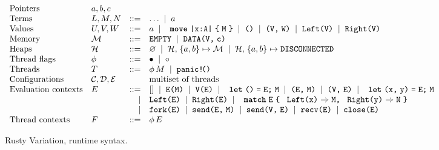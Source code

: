 \begin{figure*}
  \begin{mdframed}\begin{highlight}
    \centering
    \(
    \begin{array}{llrl}
      \text{Pointers}
      &\tm{a}, \tm{b}, \tm{c}
      \\
      \text{Terms}
      &\tm{L}, \tm{M}, \tm{N}
      &::= & \dots
             \sep \tm{a}
      \\
      \text{Values}
      &\tm{U}, \tm{V}, \tm{W}
      &::= & \tm{a}
             \sep \rvAbs[A]{x}{M}
             \sep \rvUnit
             \sep \rvPair{V}{W}
             \sep \rvInl{V}
             \sep \rvInr{V}
      \\
      \text{Memory}
      &\tm{\rvMem{M}}
      &::= & \rvMemEmp
             \sep \rvMemData{V}{c}
      \\
      \text{Heaps}
      &\tm{\rvHeap{H}}
      &::= & \rvHeapEmp
             \sep \rvHeapData{\rvHeap{H}}{a}{b}{\rvMem{M}}
             \sep \rvHeapDisc{\rvHeap{H}}{a}{b}
      \\
      \text{Thread flags}
      &\tm{\phi}
      &::= & \rvFlagMain
             \sep \rvFlagChild
      \\
      \text{Threads}
      &\tm{T}
      &::= & \rvThread{\phi}{M}
             \sep \rvPanic
      \\
      \text{Configurations}
      &\rvConf{C}, \rvConf{D}, \rvConf{E}
      &    & \text{multiset of threads}
      \\
      \text{Evaluation contexts}
      &\tm{E}
      &::= & \rvHole
             \sep \rvApp{E}{M}
             \sep \rvApp{V}{E}
             \sep \rvLetUnit{E}{M}
             \sep \rvPair{E}{M}
             \sep \rvPair{V}{E}
             \sep \rvLetPair{x}{y}{E}{M}
      \\
      &
      &\mid& \rvInl{E}
             \sep \rvInr{E}
             \sep \rvCaseSum{E}{x}{M}{y}{N}
      \\
      &
      &\mid& \rvFork{E}
             \sep \rvSend{E}{M}
             \sep \rvSend{V}{E}
             \sep \rvRecv{E}
             \sep \rvClose{E}
      \\
      \text{Thread contexts}
      &\tm{F}
      &::= & \rvThread{\phi}{E}
    \end{array}
    \)
  \end{highlight}\end{mdframed}
  \caption{Rusty Variation, runtime syntax.}
  \label{fig:rv-runtime}
\end{figure*}

